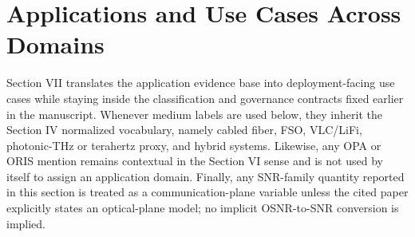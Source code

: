 \section{Applications and Use Cases Across Domains}
\label{sec:applications}

Section VII translates the application evidence base into deployment-facing use cases while staying inside the classification and governance contracts fixed earlier in the manuscript. Whenever medium labels are used below, they inherit the Section IV normalized vocabulary, namely cabled fiber, FSO, VLC/LiFi, photonic-THz or terahertz proxy, and hybrid systems. Likewise, any OPA or ORIS mention remains contextual in the Section VI sense and is not used by itself to assign an application domain. Finally, any SNR-family quantity reported in this section is treated as a communication-plane variable unless the cited paper explicitly states an optical-plane model; no implicit OSNR-to-SNR conversion is implied.

